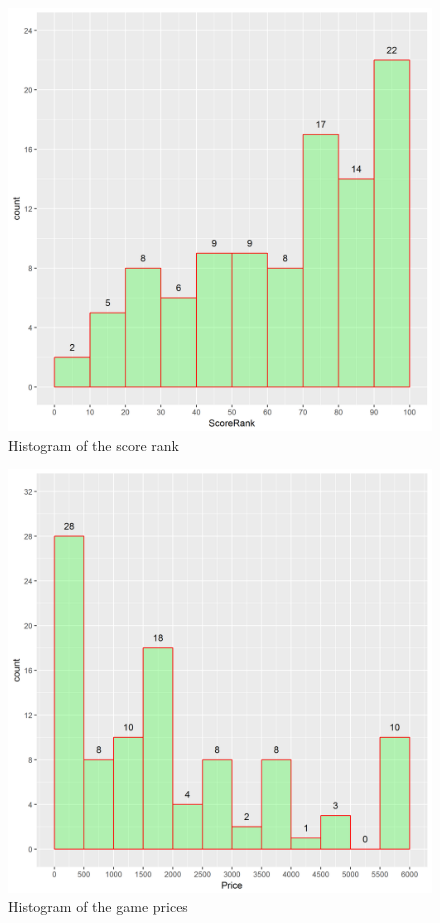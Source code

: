 \documentclass[figures_tabs.tex]{subfiles}
\begin{document}
\begin{figure}[H]
    \centering
    \includegraphics[scale=0.5]{img/score_rank.png}
    \caption{Histogram of the score rank}
    \label{fig:score_rank}
\end{figure}

\begin{figure}[H]
    \centering
    \includegraphics[scale=0.5]{img/price.png}
    \caption{Histogram of the game prices}
    \label{fig:price}
\end{figure}
\end{document}
